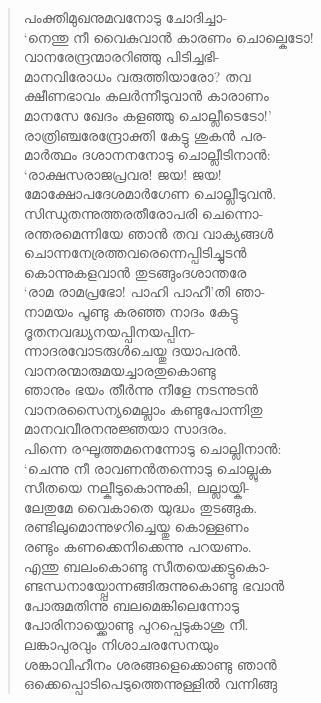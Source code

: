 \begin{verse}
പംക്തിമുഖനുമവനോടു ചോദിച്ചാ-\\
‘നെന്തു നീ വൈകുവാന്‍ കാരണം ചൊല്കെടോ!\\
വാനരേന്ദ്രന്മാരറിഞ്ഞു പിടിച്ചഭി-\\
മാനവിരോധം വരുത്തിയാരോ? തവ\\
ക്ഷീണഭാവം കലര്‍ന്നീടുവാന്‍ കാരാണം\\
മാനസേ ഖേദം കളഞ്ഞു ചൊല്ലീടെടോ!’\\
രാത്രിഞ്ചരേന്ദ്രോക്തി കേട്ടു ശുകന്‍ പര-\\
മാര്‍ത്ഥം ദശാനനനോടു ചൊല്ലീടിനാന്‍:\\
‘രാക്ഷസരാജപ്രവര! ജയ! ജയ!\\
മോക്ഷോപദേശമാര്‍ഗേണ ചൊല്ലീടുവന്‍.\\
സിന്ധുതന്നുത്തരതീരോപരി ചെന്നൊ-\\
രന്തരമെന്നിയേ ഞാന്‍ തവ വാക്യങ്ങള്‍\\
ചൊന്നനേര്രത്തവരെന്നെപ്പിടിച്ചുടന്‍\\
കൊന്നുകളവാന്‍ തുടങ്ങുംദശാന്തരേ\\
‘രാമ രാമപ്രഭോ! പാഹി പാഹീ’തി ഞാ-\\
നാമയം പൂണ്ടു കരഞ്ഞ നാദം കേട്ടു\\
ദൂതനവദ്ധ്യനയപ്പിനയപ്പിന-\\
ന്നാദരവോടരുള്‍ചെയ്തു ദയാപരന്‍.\\
വാനരന്മാരുമയച്ചാരതുകൊണ്ടു\\
ഞാനും ഭയം തീര്‍ന്നു നീളേ നടന്നുടന്‍\\
വാനരസൈന്യമെല്ലാം കണ്ടുപോന്നിതു\\
മാനവവീരനനുജ്ഞയാ സാദരം.\\
പിന്നെ രഘൂത്തമനെന്നോടു ചൊല്ലിനാന്‍:\\
‘ചെന്നു നീ രാവണന്‍തന്നൊടു ചൊല്ലുക\\
സീതയെ നല്കീടുകൊന്നുകി, ലല്ലായ്കി-\\
ലേതുമേ വൈകാതെ യുദ്ധം തുടങ്ങുക.\\
രണ്ടിലുമൊന്നുഴറിച്ചെയ്തു കൊള്ളണം\\
രണ്ടും കണക്കെനിക്കെന്നു പറയണം.\\
എന്തു ബലംകൊണ്ടു സീതയെക്കട്ടുകൊ-\\
ണ്ടന്ധനായ്പ്പോന്നങ്ങിരുന്നുകൊണ്ടു ഭവാന്‍\\
പോരുമതിന്നു ബലമെങ്കിലെന്നോടു\\
പോരിനായ്ക്കൊണ്ടു പുറപ്പെടുകാശു നീ.\\
ലങ്കാപുരവും നിശാചരസേനയും\\
ശങ്കാവിഹീനം ശരങ്ങളെക്കൊണ്ടു ഞാന്‍\\
ഒക്കെപ്പൊടിപെടുത്തെന്നുള്ളില്‍ വന്നിങ്ങു\\

\end{verse}
